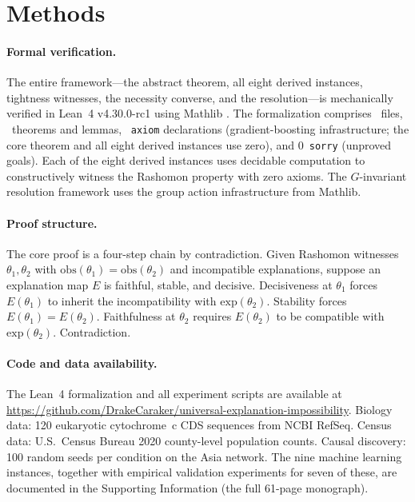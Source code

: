 \documentclass[11pt]{article}
\begin{document}

\section*{Methods}

\paragraph{Formal verification.}
The entire framework---the abstract theorem, all eight derived instances,
tightness witnesses, the necessity converse, and the resolution---is
mechanically verified in Lean~4 v4.30.0-rc1 \citep{demoura2021lean4} using
Mathlib \citep{mathlib2020}.  The formalization comprises \ClaimMainFiles~files,
\ClaimMainTheorems~theorems and lemmas, \ClaimMainAxioms~\texttt{axiom} declarations
(gradient-boosting infrastructure; the core theorem and all eight derived instances
use zero), and 0~\texttt{sorry} (unproved goals).  Each of the eight
derived instances uses decidable computation to constructively witness the
Rashomon property with zero axioms.  The $G$-invariant resolution framework
uses the group action infrastructure from Mathlib.

\paragraph{Proof structure.}
The core proof is a four-step chain by contradiction.  Given Rashomon
witnesses $\theta_1, \theta_2$ with $\mathrm{obs}(\theta_1) =
\mathrm{obs}(\theta_2)$ and incompatible explanations, suppose an
explanation map $E$ is faithful, stable, and decisive.  Decisiveness at
$\theta_1$ forces $E(\theta_1)$ to inherit the incompatibility with
$\mathrm{exp}(\theta_2)$.  Stability forces $E(\theta_1) = E(\theta_2)$.
Faithfulness at $\theta_2$ requires $E(\theta_2)$ to be compatible with
$\mathrm{exp}(\theta_2)$.  Contradiction.

\paragraph{Code and data availability.}
The Lean~4 formalization and all experiment scripts are available at
\url{https://github.com/DrakeCaraker/universal-explanation-impossibility}.
Biology data: 120 eukaryotic cytochrome~c CDS sequences from NCBI RefSeq.
Census data: U.S.\ Census Bureau 2020 county-level population counts.
Causal discovery: 100 random seeds per condition on the Asia network.
The nine machine learning instances, together with empirical validation
experiments for seven of these, are documented in the Supporting
Information (the full 61-page monograph).




\end{document}
